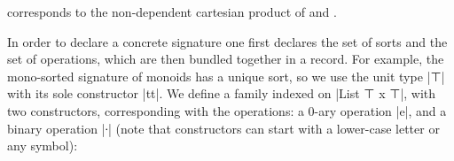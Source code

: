 \noindent {} corresponds to the non-dependent cartesian product
of  and .

In order to declare a concrete signature one first declares
the set of sorts and the set of operations, which are then bundled
together in a record.  For example, the mono-sorted signature of monoids has a
unique sort, so we use the unit type |⊤| with its sole constructor
|tt|. We define a family indexed on |List ⊤ x ⊤|, with two constructors,
corresponding with the operations: a 0-ary operation |e|, and a binary
operation |∙| (note that constructors can
start with a lower-case letter or any symbol):

\begin{code}
\>[0]\AgdaSpace{}%
\AgdaSpace{}%
\AgdaSymbol{:}\AgdaSpace{}%
\AgdaSpace{}%
\AgdaSpace{}%
\AgdaSpace{}%
\AgdaSpace{}%
\AgdaSpace{}%
\AgdaSpace{}%
\<%
\\
\>[0][@{}l@{\AgdaIndent{0}}]%
\>[3]\AgdaSpace{}%
\AgdaSymbol{:}\AgdaSpace{}%
\AgdaSpace{}%
\AgdaSymbol{(}\AgdaInductiveConstructor{[]}\AgdaSpace{}%
\AgdaOperator{\AgdaInductiveConstructor{,}}\AgdaSpace{}%
\AgdaSymbol{)}\<%
\\
%
\>[3]\AgdaSpace{}%
\AgdaSymbol{:}\AgdaSpace{}%
\AgdaSpace{}%
\AgdaSymbol{(}\AgdaSpace{}%
\AgdaSpace{}%
\AgdaOperator{\AgdaFunction{[}}\AgdaSpace{}%
\AgdaSpace{}%
\AgdaOperator{\AgdaFunction{]}}\AgdaSpace{}%
\AgdaOperator{\AgdaInductiveConstructor{,}}\AgdaSpace{}%
\AgdaSymbol{)}\<%
\\
\\
\>[0]\AgdaSpace{}%
\AgdaSymbol{:}\AgdaSpace{}%
\<%
\\
\>[0]\AgdaSpace{}%
\AgdaSymbol{=}\AgdaSpace{}%
\AgdaSpace{}%
\AgdaSymbol{\{}\AgdaSpace{}%
\AgdaSpace{}%
\AgdaSymbol{=}\AgdaSpace{}%
\AgdaSpace{}%
\AgdaSymbol{;}\AgdaSpace{}%
\AgdaSpace{}%
\AgdaSymbol{=}\AgdaSpace{}%
\AgdaSpace{}%
\AgdaSymbol{\}}\<%
\end{code}

